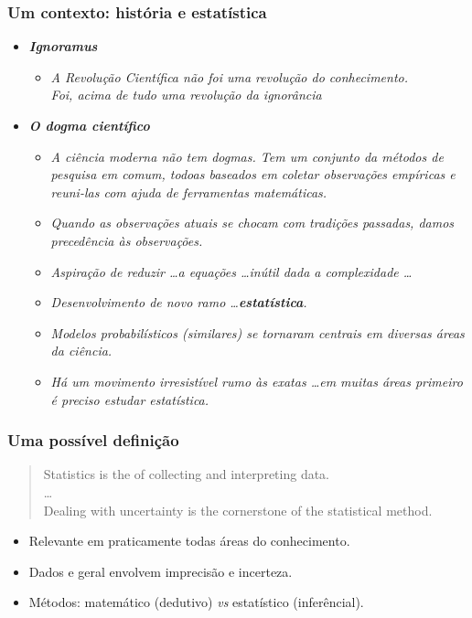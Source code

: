 \documentclass[handout,serif, professionalfont, usenames, dvipsnames, aspectratio = 169]{beamer}\usepackage[]{graphicx}\usepackage[]{color}
\begin{document}
\begin{frame}
  \frametitle{Um contexto: história e estatística }
  
  \begin{itemize}
    \itemsep 1.5ex
  \item \textit{\bf Ignoramus}
    \begin{itemize}
    \item  \textit{A Revolução Científica não foi uma revolução do conhecimento. \\
      Foi, acima de tudo uma revolução da ignorância}
    \end{itemize}
  \item \textit{\bf O dogma científico}
    \begin{itemize}
    \item  \textit{A ciência moderna não tem dogmas. Tem um conjunto da métodos de pesquisa em comum, todoas baseados em coletar observações empíricas e reuni-las com ajuda de ferramentas matemáticas.}
    \item \textit{Quando as observações atuais se chocam com tradições passadas, damos precedência às observações.}
    \item \textit{Aspiração de reduzir \ldots a equações \ldots inútil dada a complexidade \ldots} 
    \item \textit{Desenvolvimento de novo ramo \ldots {\bf estatística}.}
    \item \textit{Modelos probabilísticos (similares) se tornaram centrais em diversas áreas da ciência.}
    \item \textit{Há um movimento irresistível rumo às exatas \ldots em muitas áreas primeiro é preciso estudar estatística.}
    \end{itemize}
  \end{itemize}
\end{frame}

\begin{frame}
  \frametitle{Uma possível definição}
  \begin{quote}
    Statistics is the  of collecting and interpreting data. \\
    \ldots\\
    Dealing with uncertainty is the cornerstone of the statistical method.\\
        \hfill \cite{diggle+chetwynd:2011}
  \end{quote}
\pause
  \begin{itemize}
    \itemsep 2ex
  \item Relevante em praticamente todas áreas do conhecimento.
  \item Dados e geral envolvem imprecisão e incerteza.
  \item Métodos: matemático (dedutivo) {\it vs} estatístico (inferêncial).
  \end{itemize}
\end{frame}
\end{document}
